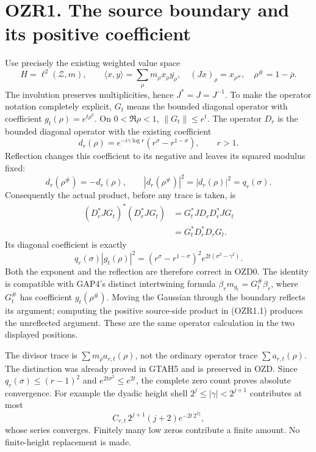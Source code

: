 \section{OZR1. The source boundary and its positive
coefficient}\label{ozr1.-the-source-boundary-and-its-positive-coefficient}

Use precisely the existing weighted value space \[
H=\ell^2(\mathscr Z,m),\qquad
\langle x,y\rangle=\sum_\rho m_\rho x_\rho\overline{y_\rho},
\quad (Jx)_\rho=x_{\rho^\#},\quad \rho^\#=1-\overline\rho.
\] The involution preserves multiplicities, hence \(J^*=J=J^{-1}\). To
make the operator notation completely explicit, \(G_t\) means the
bounded diagonal operator with coefficient \(g_t(\rho)=e^{t\rho^2}\). On
\(0<\Re\rho<1\), \(\|G_t\|\le e^t\). The operator \(D_r\) is the bounded
diagonal operator with the existing coefficient \[
d_r(\rho)=e^{-i\gamma\log r}(r^\sigma-r^{1-\sigma}),\qquad r>1.
\] Reflection changes this coefficient to its negative and leaves its
squared modulus fixed: \[
d_r(\rho^\#)=-d_r(\rho),\qquad
|d_r(\rho^\#)|^2=|d_r(\rho)|^2=q_r(\sigma).
\] Consequently the actual product, before any trace is taken, is \[
\begin{aligned}
(D_r^*JG_t)^*(D_r^*JG_t)
&=G_t^*JD_rD_r^*JG_t\\
&=G_t^*D_r^*D_rG_t.
\end{aligned}
\tag{OZR1.1}
\] Its diagonal coefficient is exactly \[
q_r(\sigma)|g_t(\rho)|^2
=(r^\sigma-r^{1-\sigma})^2e^{2t(\sigma^2-\gamma^2)}.
\tag{OZR1.2}
\] Both the exponent and the reflection are therefore correct in OZD0.
The identity is compatible with GAP4's distinct intertwining formula
\(\beta_rm_{g_t}=G_t^\#\beta_r\), where \(G_t^\#\) has coefficient
\(g_t(\rho^\#)\). Moving the Gaussian through the boundary reflects its
argument; computing the positive source-side product in (OZR1.1)
produces the unreflected argument. These are the same operator
calculation in the two displayed positions.

The divisor trace is \(\sum m_\rho a_{r,t}(\rho)\), not the ordinary
operator trace \(\sum a_{r,t}(\rho)\). The distinction was already
proved in GTAH5 and is preserved in OZD. Since \(q_r(\sigma)\le(r-1)^2\)
and \(e^{2t\sigma^2}\le e^{2t}\), the complete zero count proves
absolute convergence. For example the dyadic height shell
\(2^j\le|\gamma|<2^{j+1}\) contributes at most \[
C_{r,t}\,2^{j+1}(j+2)e^{-2t\,2^{2j}},
\] whose series converges. Finitely many low zeros contribute a finite
amount. No finite-height replacement is made.

